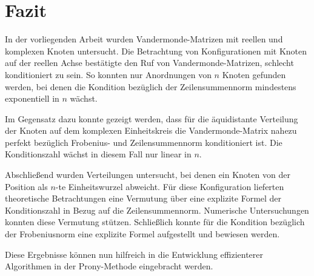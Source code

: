 \chapter{Fazit}

In der vorliegenden Arbeit wurden Vandermonde-Matrizen mit reellen und
komplexen Knoten untersucht.
Die Betrachtung von Konfigurationen mit Knoten auf der reellen Achse
bestätigte den Ruf von Vandermonde-Matrizen, schlecht konditioniert zu sein.
So konnten nur Anordnungen von $n$ Knoten gefunden werden, bei denen die Kondition
bezüglich der Zeilensummennorm mindestens exponentiell in $n$ wächst.

Im Gegensatz dazu konnte gezeigt werden, dass für die äquidistante Verteilung
der Knoten auf dem komplexen Einheitskreis die Vandermonde-Matrix nahezu
perfekt bezüglich Frobenius- und Zeilensummennorm konditioniert ist.  Die
Konditionszahl wächst in diesem Fall nur linear in $n$.

Abschließend wurden Verteilungen untersucht, bei denen ein Knoten von der
Position als $n$-te Einheitswurzel abweicht.  Für diese Konfiguration
lieferten theoretische Betrachtungen eine Vermutung über eine explizite Formel
der Konditionszahl in Bezug auf die Zeilensummennorm.  Numerische
Untersuchungen konnten diese Vermutung stützen.  Schließlich konnte für die
Kondition bezüglich der Frobeniusnorm eine explizite Formel aufgestellt und
bewiesen werden.

Diese Ergebnisse können nun hilfreich in die Entwicklung effizienterer
Algorithmen in der Prony-Methode eingebracht werden.
